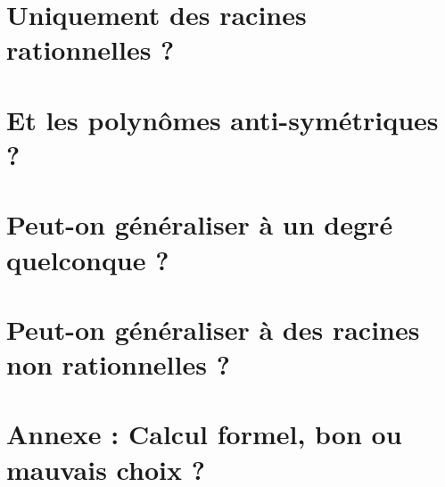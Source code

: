 \documentclass[12pt]{amsart}
\begin{document}
\section{Uniquement des racines rationnelles ?}





\section{Et les polynômes anti-symétriques ?}





\section{Peut-on généraliser à un degré quelconque ?}





\section{Peut-on généraliser à des racines non rationnelles ?}





\section*{Annexe : Calcul formel, bon ou mauvais choix ?}


\end{document}
